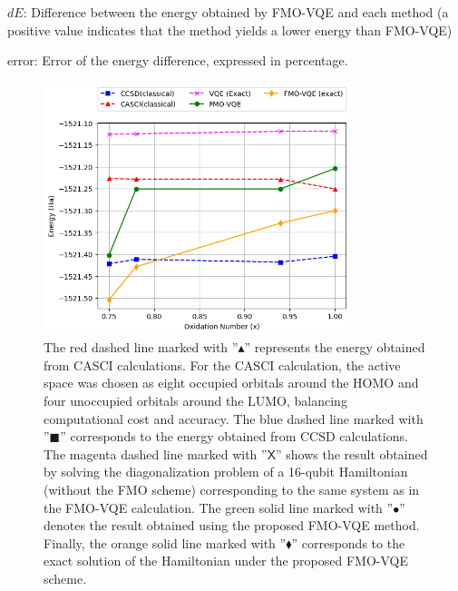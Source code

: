 \documentclass[pdflatex,sn-mathphys-num]{sn-jnl}%
\theoremstyle{thmstyleone}%
\theoremstyle{thmstyletwo}%
\theoremstyle{thmstylethree}%
\begin{document}
\begin{table}
$dE$\footnotemark[1] : {Difference between the energy obtained by FMO-VQE and each method (a positive value indicates that the method yields a lower energy than FMO-VQE)}

error\footnotemark[2] : {Error of the energy difference, expressed in percentage.}

\end{table}

\begin{figure}[htbp]
\centering
\includegraphics[width=0.8\textwidth]{fig/result2.png}
\caption{The red dashed line marked with $”\blacktriangle”$ represents the energy obtained from CASCI calculations. For the CASCI calculation, the active space was chosen as eight occupied orbitals around the HOMO and four unoccupied orbitals around the LUMO, balancing computational cost and accuracy. The blue dashed line marked with $”\blacksquare”$ corresponds to the energy obtained from CCSD calculations. The magenta dashed line marked with $”\mathsf{X}”$ shows the result obtained by solving the diagonalization problem of a 16-qubit Hamiltonian (without the FMO scheme) corresponding to the same system as in the FMO-VQE calculation. The green solid line marked with $”\bullet”$ denotes the result obtained using the proposed FMO-VQE method. Finally, the orange solid line marked with $”\blacklozenge”$ corresponds to the exact solution of the Hamiltonian under the proposed FMO-VQE scheme.}\label{Fig.5}
\end{figure}
\end{document}
